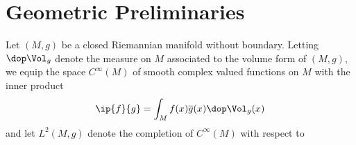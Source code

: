 \section{Geometric Preliminaries}
Let $(M,g)$ be a closed Riemannian manifold without boundary. Letting $\dop \Vol_g$ denote the measure on $M$ associated to the volume form of $(M,g)$, we equip the space $C^\infty(M)$ of smooth complex valued functions on $M$ with the inner product 
\begin{align*}
    \ip{f}{g} = \int_M f(x) \overline{g}(x) \dop \Vol_g(x) 
\end{align*}
and let $L^2(M,g)$ denote the completion of $C^\infty(M)$ with respect to 